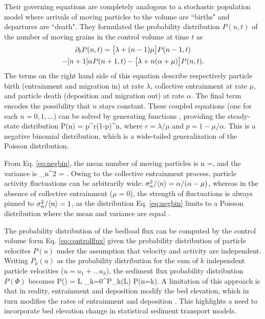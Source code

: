 Their governing equations are completely analogous to a stochastic population model \citep{Cox1965, Pielou1977} where arrivals of moving particles to the volume are ``births" and departures are ``death".
They formulated the probability distribution $P(n,t)$ of the number of moving grains in the control volume at time $t$ as
\begin{multline} \partial_t P(n,t) = \big[\lambda + (n-1)\mu\big] P(n-1,t) \\ - [n+1]\alpha P(n+1,t) - \big[\lambda + n (\alpha + \mu)\big]P(n,t).\end{multline}
The terms on the right hand side of this equation describe respectively particle birth (entrainment and migration in) at rate $\lambda$, collective entrainment at rate $\mu$, and particle death (deposition and migration out) at rate $\alpha$.
The final term encodes the possibility that $n$ stays constant.
These coupled equations (one for each $n=0,1,\dots$) can be solved by generating functions \citep{Cox1965}, providing the steady-state distribution
\be P(n) = p^r(1-p)^n, \label{eq:negbin}\ee
where $r = \lambda/\mu$ and $p = 1-\mu/\alpha$.
This is a negative binomial distribution, which is a wide-tailed generalization of the Poisson distribution.

From Eq. \ref{eq:negbin}, the mean number of moving particles is 
\be \langle n \rangle =\frac{ \lambda}{\alpha-\mu},\ee
 and the variance is
\be \sigma_n^2 = . \ee
Owing to the collective entrainment process, particle activity fluctuations can be arbitrarily wide: $\sigma_n^2/\langle n \rangle = \alpha/(\alpha-\mu)$, whereas in the absence of collective entrainment ($\mu=0$), the strength of fluctuations is always pinned to $\sigma_n^2/\langle n\rangle = 1$, as the distribution Eq. \ref{eq:negbin} limits to a Poisson distribution where the mean and variance are equal \citep[e.g.][]{Ancey2006}.

The probability distribution of the bedload flux can be computed by the control volume form Eq. \ref{eq:controlflux} given the probability distribution of particle velocites $P(u)$ under the assumption that velocity and activity are independent.
Writing $P_k(u)$ as the probability distribution for the sum of $k$ independent particle velocities ($u=u_1+\dots u_k$), the sediment flux probability distribution $P(\Phi)$ becomes \citep{Ancey2020a}
\be P(\Phi) = L \sum_{k=0}^\infty P_k(L\Phi) P(n=k). \ee
A limitation of this approach is that in reality, entrainment and deposition modify the bed elevation, which in turn modifies the rates of entrainment and deposition \citep{Sawai1987,Wong2007}. 
This highlights a need to incorporate bed elevation change in statistical sediment transport models.

